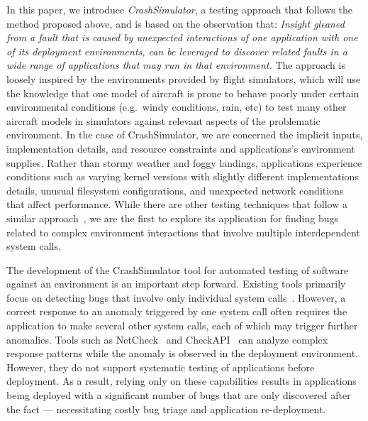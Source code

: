 In this paper, we introduce {\em CrashSimulator}, a testing approach that
follows the method proposed above, and is based on the
observation that: {\em Insight gleaned from a fault that is
  caused by unexpected interactions of {\em one application} with one
  of its deployment environments, can be leveraged to discover related
  faults in a {\em wide range} of applications that may run in that
  environment.}  The approach is loosely inspired by the 
environments provided by flight simulators, which  will use the knowledge that
one model
of aircraft is prone to behave poorly under certain environmental
conditions (e.g.\ windy conditions, rain, etc) to
test many other aircraft models in simulators against relevant
aspects of the problematic environment.  In the case of CrashSimulator,
we are concerned the implicit inputs, implementation details, and resource
constraints and applications's environment supplies.  Rather than stormy
weather and foggy landings, applications experience conditions such as varying
kernel versions with slightly different implementations details,
unusual filesystem configurations, and unexpected network conditions that
affect performance.
While there are other testing techniques
that follow a similar approach~\cite{mariani2007compatibility,
  DBLP:journals/ase/WasylkowskiZ11, DBLP:conf/icse/PradelJAG12,
  DBLP:journals/tosem/MonperrusM13,
  DBLP:conf/icse/JamrozikSZ16}, we are the first to explore
its application for finding bugs related to complex environment
interactions that involve multiple interdependent system calls.

The development of the CrashSimulator tool for automated testing of software
against an environment is an important step forward.
Existing tools primarily
focus on detecting bugs that involve only individual system
calls~\cite{Koopman00theexception,Dadeau:2008:CSM:1433121.1433137,Farchi02}. However,
a correct response to an anomaly triggered by one
system call often requires the application to make several other
system calls, each of which may trigger further anomalies. Tools such
as NetCheck~\cite{Zhuang_NSDI_2014} and
CheckAPI~\cite{rasley2015detecting} can analyze complex response
patterns while the anomaly is observed in the deployment
environment. However, they do not support systematic testing of
applications before deployment.  As a result, relying only on these
capabilities results in applications being deployed
with a significant number of bugs that are only discovered after the fact
--- necessitating costly bug triage and application re-deployment.

